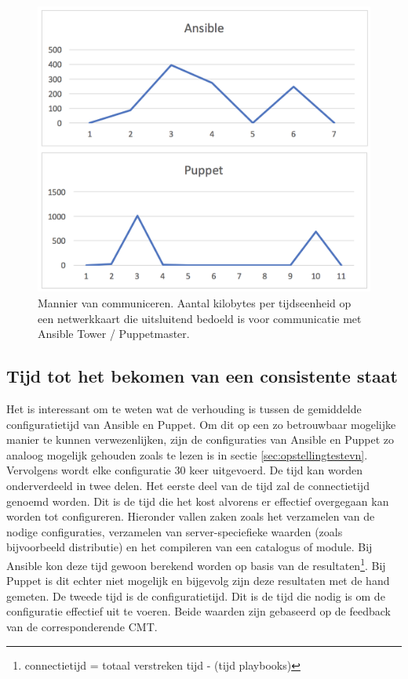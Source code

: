 \begin{figure}
	\includegraphics[width=\linewidth]{img/deploytypes.png}
	\caption{Mannier van communiceren. Aantal kilobytes per tijdseenheid op een netwerkkaart die uitsluitend bedoeld is voor communicatie met Ansible Tower / Puppetmaster. }  
	\label{fig:deploytypes}
\end{figure}
 
\subsection{Tijd tot het bekomen van een consistente staat}

Het is interessant om te weten wat de verhouding is tussen de gemiddelde \gls{configuratietijd} van Ansible en Puppet. Om dit op een zo betrouwbaar mogelijke manier te kunnen verwezenlijken, zijn de configuraties van Ansible en Puppet zo analoog mogelijk gehouden zoals te lezen is in sectie \ref{sec:opstellingtestevn}. Vervolgens wordt elke configuratie 30 keer uitgevoerd. De tijd kan worden onderverdeeld in twee delen.\newline
Het eerste deel van de tijd zal de \gls{connectietijd} genoemd worden. Dit is de tijd die het kost alvorens er effectief overgegaan kan worden tot configureren. Hieronder vallen zaken zoals het verzamelen van de nodige configuraties, verzamelen van server-speciefieke waarden (zoals bijvoorbeeld distributie) en het compileren van een catalogus of module. Bij Ansible kon deze tijd gewoon berekend worden op basis van de resultaten\footnote{connectietijd = totaal verstreken tijd -  \unexpanded{$ \sum  $} (tijd playbooks)}. Bij Puppet is dit echter niet mogelijk en bijgevolg zijn deze resultaten met de hand gemeten.\newline
 De tweede tijd is de \gls{configuratietijd}. Dit is de tijd die nodig is om de configuratie effectief uit te voeren. Beide waarden zijn gebaseerd op de feedback van de corresponderende \gls{CMT}.




